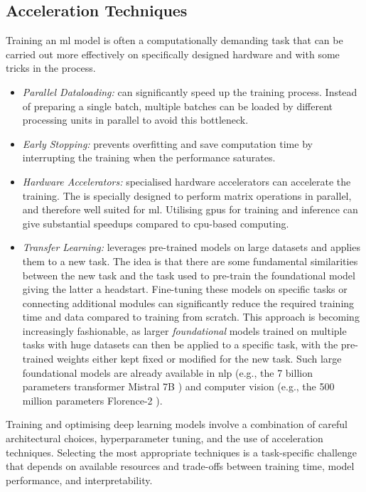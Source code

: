 \subsection{Acceleration Techniques}
Training an \gls{ml} model is often a computationally demanding task that can be carried out more effectively on specifically designed hardware and with some tricks in the process. 
\begin{itemize}[leftmargin=*]
    \item \textit{Parallel Dataloading:} can significantly speed up the training process. Instead of preparing a single batch, multiple batches can be loaded by different processing units in parallel to avoid this bottleneck. 
    \item \textit{Early Stopping:} prevents overfitting and save computation time by interrupting the training when the performance saturates.
    \item  \textit{Hardware Accelerators:} specialised hardware accelerators can accelerate the training. The  is specially designed to perform matrix operations in parallel, and therefore well suited for \gls{ml}. Utilising \glspl{gpu} for training and inference can give substantial speedups compared to \gls{cpu}-based computing. 
    \item \textit{Transfer Learning:} leverages pre-trained models on large datasets and applies them to a new task. The idea is that there are some fundamental similarities between the new task and the task used to pre-train the foundational model giving the latter a headstart. Fine-tuning these models on specific tasks or connecting additional modules can significantly reduce the required training time and data compared to training from scratch. This approach is becoming increasingly fashionable, as larger \textit{foundational} models trained on multiple tasks with huge datasets can then be applied to a specific task, with the pre-trained weights either kept fixed or modified for the new task. Such large foundational models are already available in \gls{nlp} (e.g., the 7 billion parameters transformer Mistral 7B \cite{jiang2023mistral}) and computer vision (e.g., the 500 million parameters Florence-2 \cite{xiao2023florence2}).
\end{itemize}
Training and optimising deep learning models involve a combination of careful architectural choices, hyperparameter tuning, and the use of acceleration techniques. Selecting the most appropriate techniques is a task-specific challenge that depends on available resources and trade-offs between training time, model performance, and interpretability.
